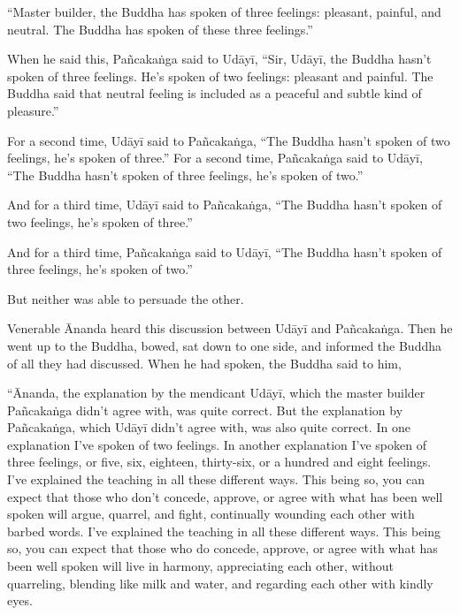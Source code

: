 \documentclass[12pt,openany]{book}%
\begin{document}
“Master builder, the Buddha has spoken of three feelings: pleasant, painful, and neutral. The Buddha has spoken of these three feelings.” 

When he said this, \textsanskrit{Pañcakaṅga} said to \textsanskrit{Udāyī}, “Sir, \textsanskrit{Udāyī}, the Buddha hasn’t spoken of three feelings. He’s spoken of two feelings: pleasant and painful. The Buddha said that neutral feeling is included as a peaceful and subtle kind of pleasure.” 

For a second time, \textsanskrit{Udāyī} said to \textsanskrit{Pañcakaṅga}, “The Buddha hasn’t spoken of two feelings, he’s spoken of three.” For a second time, \textsanskrit{Pañcakaṅga} said to \textsanskrit{Udāyī}, “The Buddha hasn’t spoken of three feelings, he’s spoken of two.” 

And for a third time, \textsanskrit{Udāyī} said to \textsanskrit{Pañcakaṅga}, “The Buddha hasn’t spoken of two feelings, he’s spoken of three.” 

And for a third time, \textsanskrit{Pañcakaṅga} said to \textsanskrit{Udāyī}, “The Buddha hasn’t spoken of three feelings, he’s spoken of two.” 

But neither was able to persuade the other. 

Venerable Ānanda heard this discussion between \textsanskrit{Udāyī} and \textsanskrit{Pañcakaṅga}. Then he went up to the Buddha, bowed, sat down to one side, and informed the Buddha of all they had discussed. When he had spoken, the Buddha said to him, 

“Ānanda, the explanation by the mendicant \textsanskrit{Udāyī}, which the master builder \textsanskrit{Pañcakaṅga} didn’t agree with, was quite correct. But the explanation by \textsanskrit{Pañcakaṅga}, which \textsanskrit{Udāyī} didn’t agree with, was also quite correct. In one explanation I’ve spoken of two feelings. In another explanation I’ve spoken of three feelings, or five, six, eighteen, thirty-six, or a hundred and eight feelings. I’ve explained the teaching in all these different ways. This being so, you can expect that those who don’t concede, approve, or agree with what has been well spoken will argue, quarrel, and fight, continually wounding each other with barbed words. I’ve explained the teaching in all these different ways. This being so, you can expect that those who do concede, approve, or agree with what has been well spoken will live in harmony, appreciating each other, without quarreling, blending like milk and water, and regarding each other with kindly eyes. 
\end{document}
